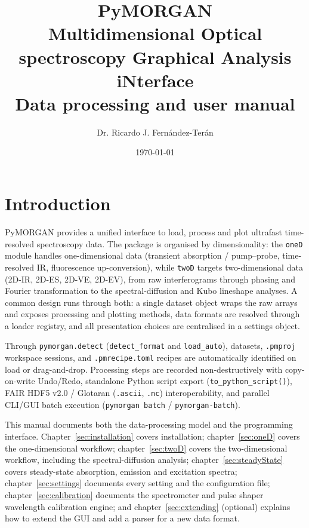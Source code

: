 \documentclass[11pt,a4paper]{article}
\title{\textbf{PyMORGAN}\\[0.3em]
  \large Multidimensional Optical spectroscopy Graphical Analysis iNterface\\
  \large Data processing and user manual}
\author{Dr. Ricardo J. Fernández-Terán}
\date{\today}
\newcommand{\code}[1]{\texttt{#1}}
\begin{document}
\maketitle
\tableofcontents
\bigskip

\section{Introduction}
PyMORGAN provides a unified interface to load, process and plot ultrafast
time-resolved spectroscopy data. The package is organised by dimensionality:
the \code{oneD} module handles one-dimensional data (transient absorption /
pump--probe, time-resolved IR, fluorescence up-conversion), while \code{twoD}
targets two-dimensional data (2D-IR, 2D-ES, 2D-VE, 2D-EV), from raw
interferograms through phasing and Fourier transformation to the
spectral-diffusion and Kubo lineshape analyses. A common design
runs through both: a single dataset object wraps the raw arrays and exposes
processing and plotting methods, data formats are resolved through a loader
registry, and all presentation choices are centralised in a settings object.

Through \code{pymorgan.detect} (\code{detect\_format} and \code{load\_auto}), datasets, \code{.pmproj} workspace sessions, and \code{.pmrecipe.toml} recipes are automatically identified on load or drag-and-drop. Processing steps are recorded non-destructively with copy-on-write Undo/Redo, standalone Python script export (\code{to\_python\_script()}), FAIR HDF5 v2.0 / Glotaran (\code{.ascii}, \code{.nc}) interoperability, and parallel CLI/GUI batch execution (\code{pymorgan batch} / \code{pymorgan-batch}).

This manual documents both the data-processing model and the programming
interface. Chapter~\ref{sec:installation} covers installation;
chapter~\ref{sec:oneD} covers the one-dimensional workflow;
chapter~\ref{sec:twoD} covers the two-dimensional workflow, including the
spectral-diffusion analysis; chapter~\ref{sec:steadyState} covers steady-state
absorption, emission and excitation spectra; chapter~\ref{sec:settings}
documents every setting and the configuration file;
chapter~\ref{sec:calibration} documents the spectrometer and pulse shaper
wavelength calibration engine; and chapter~\ref{sec:extending} (optional)
explains how to extend the GUI and add a parser for a new data format.








\end{document}
